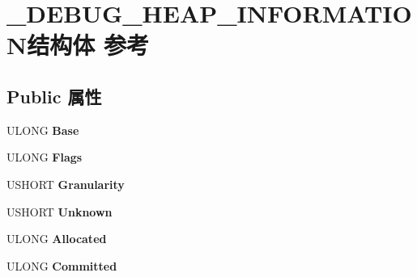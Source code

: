 \hypertarget{struct___d_e_b_u_g___h_e_a_p___i_n_f_o_r_m_a_t_i_o_n}{}\section{\+\_\+\+D\+E\+B\+U\+G\+\_\+\+H\+E\+A\+P\+\_\+\+I\+N\+F\+O\+R\+M\+A\+T\+I\+O\+N结构体 参考}
\label{struct___d_e_b_u_g___h_e_a_p___i_n_f_o_r_m_a_t_i_o_n}
\subsection*{Public 属性}
\begin{DoxyCompactItemize}
\item 
\mbox{\label{struct___d_e_b_u_g___h_e_a_p___i_n_f_o_r_m_a_t_i_o_n_a468ae7e1b7af5b982a9eafd26250e1d3}} 
U\+L\+O\+NG {\bfseries Base}
\item 
\mbox{\label{struct___d_e_b_u_g___h_e_a_p___i_n_f_o_r_m_a_t_i_o_n_a550713fad6ef388f1ab8d60116d57ebd}} 
U\+L\+O\+NG {\bfseries Flags}
\item 
\mbox{\label{struct___d_e_b_u_g___h_e_a_p___i_n_f_o_r_m_a_t_i_o_n_aec0bc53fa475cd7c4df989a5fd6c6ddf}} 
U\+S\+H\+O\+RT {\bfseries Granularity}
\item 
\mbox{\label{struct___d_e_b_u_g___h_e_a_p___i_n_f_o_r_m_a_t_i_o_n_a23a85b243b8232e65b69136f18bb8d64}} 
U\+S\+H\+O\+RT {\bfseries Unknown}
\item 
\mbox{\label{struct___d_e_b_u_g___h_e_a_p___i_n_f_o_r_m_a_t_i_o_n_a8bcbbc02fb30fed0b520aab698d39ca8}} 
U\+L\+O\+NG {\bfseries Allocated}
\item 
\mbox{\label{struct___d_e_b_u_g___h_e_a_p___i_n_f_o_r_m_a_t_i_o_n_a82890ef0a2d50975b6ab7964d0262d65}} 
U\+L\+O\+NG {\bfseries Committed}
\item 
\mbox{\label{struct___d_e_b_u_g___h_e_a_p___i_n_f_o_r_m_a_t_i_o_n_a4fe315d12f4f82f2366d7d87dd7052ed}} 

\end{DoxyCompactItemize}
